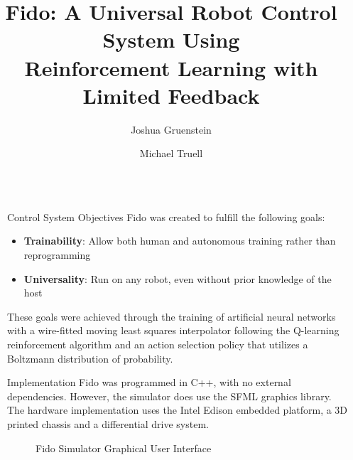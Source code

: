 \documentclass[final]{beamer}
\title{Fido: A Universal Robot Control System Using\\Reinforcement Learning with Limited Feedback}
\author{\LARGE Joshua Gruenstein \and Michael Truell}
\institute{\mbox{}}
\newlength{\sepwid}
\newlength{\onecolwid}
\begin{document}
\setlength{\belowcaptionskip}{2ex}
\setlength\belowdisplayshortskip{2ex}

\begin{frame}[t]
\begin{columns}[t]

\begin{column}{\sepwid}\end{column}
\begin{column}{\onecolwid}

	\begin{alertblock}{Control System Objectives}
		Fido was created to fulfill the following goals:
		\begin{itemize}
			\item \textbf{Trainability}: Allow both human and autonomous training rather than reprogramming
			\item \textbf{Universality}: Run on any robot, even without prior knowledge of the host
		\end{itemize}
		These goals were achieved through the training of artificial neural networks with a wire-fitted moving least squares interpolator following the Q-learning reinforcement algorithm and an action selection policy that utilizes a Boltzmann distribution of probability.
	\end{alertblock}

	\begin{block}{Implementation}
		Fido was programmed in C++, with no external dependencies.  However, the simulator does use the SFML graphics library.  The hardware implementation uses the Intel Edison embedded platform, a 3D printed chassis and a differential drive system.

		\begin{figure}
			\centering
			\caption{Fido Simulator Graphical User Interface}
		\end{figure}


\end{block}
\end{column}
\end{columns}
\end{frame}
\end{document}
